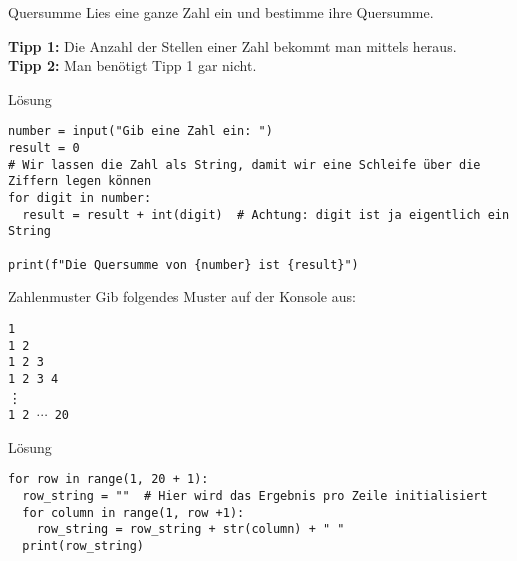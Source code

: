 \begin{fragile}

\begin{block}{Quersumme}
	\vspace{2pt}
	Lies eine ganze Zahl  ein und bestimme ihre Quersumme. 
	
	\textbf{Tipp 1:} Die Anzahl der Stellen einer Zahl bekommt man mittels  heraus. \\
	\textbf{Tipp 2:} Man benötigt Tipp 1 gar nicht.  
	
\end{block}

\vspace{12pt}

\begin{solutionblock}{Lösung}
\begin{verbatim}
number = input("Gib eine Zahl ein: ")
result = 0
# Wir lassen die Zahl als String, damit wir eine Schleife über die Ziffern legen können
for digit in number:
  result = result + int(digit)  # Achtung: digit ist ja eigentlich ein String

print(f"Die Quersumme von {number} ist {result}")
\end{verbatim}
\end{solutionblock}

\end{fragile}

\begin{fragile}
\begin{block}{Zahlenmuster}
	\vspace{2pt}	
	Gib folgendes Muster auf der Konsole aus: 
	
	\texttt{1} \\
	\texttt{1 2} \\
	\texttt{1 2 3} \\
	\texttt{1 2 3 4} \\
	\phantom{1 2 } \vdots \\
	\texttt{1 2 $\cdots$ 20}
\end{block}

\begin{solutionblock}{Lösung}
\begin{verbatim}
for row in range(1, 20 + 1):
  row_string = ""  # Hier wird das Ergebnis pro Zeile initialisiert
  for column in range(1, row +1):
    row_string = row_string + str(column) + " "
  print(row_string)
\end{verbatim}
\end{solutionblock}

\end{fragile}

